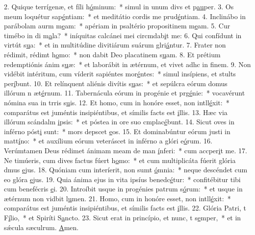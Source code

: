 2. Quique terrígenæ, et fíli h\uline{ó}minum:~* simul in unum divs et p\uline{au}per.
3. Os meum loquétur sap\uline{é}ntiam:~* et meditátio cordis me prud\uline{é}ntiam.
4. Inclinábo in parábolam aurm m\uline{e}am:~* apériam in psaltério propositinem m\uline{e}am.
5. Cur timébo in di m\uline{a}la?~* iníquitas calcánei mei circmdab\uline{i}t me:
6. Qui confídunt in virtút s\uline{u}a:~* et in multitúdine divitiárum suárum glri\uline{á}ntur.
7. Frater non rédimit, rédimt h\uline{o}mo:~* non dabit Deo placatinem s\uline{u}am.
8. Et prétium redemptiónis ánim s\uline{u}æ:~* et laborábit in ætérnum, et vivet adhc in f\uline{i}nem.
9. Non vidébit intéritum, cum víderit sapiéntes mor\uline{é}ntes:~* simul insípiens, et stults per\uline{í}bunt.
10. Et relínquent aliénis divítis s\uline{u}as:~* et sepúlcra eórum domus illórum n æt\uline{é}rnum.
11. Tabernácula eórum in progénie et prg\uline{é}nie:~* vocavérunt nómina sua in trris s\uline{u}is.
12. Et homo, cum in honóre esset, non intll\uline{é}xit:~* comparátus est juméntis insipiéntibus, et símilis facts est \uline{i}llis.
13. Hæc via illórum scándalm \uline{i}psis:~* et póstea in ore suo cmplac\uline{é}bunt.
14. Sicut oves in inférno póst\uline{i} sunt:~* mors depscet \uline{e}os.
15. Et dominabúntur eórum justi in matt\uline{í}no:~* et auxílium eórum veteráscet in inférno a glóri e\uline{ó}rum.
16. Verúmtamen Deus rédimet ánimam meam de man \uline{í}nferi:~* cum accper\uline{i}t me.
17. Ne timúeris, cum dives factus fúert h\uline{o}mo:~* et cum multiplicáta fúerit glória dmus \uline{e}jus.
18. Quóniam cum interíerit, non sumt \uline{ó}mnia:~* neque descéndet cum eo glóra \uline{e}jus.
19. Quia ánima ejus in vita ipsíus benedc\uline{é}tur:~* confitébitur tibi cum benefécris \uline{e}i.
20. Introíbit usque in progénies patrum s\uline{ó}rum:~* et usque in ætérnum non vidbit l\uline{u}men.
21. Homo, cum in honóre esset, non intll\uline{é}xit:~* comparátus est juméntis insipiéntibus, et símilis facts est \uline{i}llis.
22. Glória Patri, t F\uline{í}lio,~* et Spiríti S\uline{a}ncto.
23. Sicut erat in princípio, et nunc, t s\uline{e}mper,~* et in sǽcula sæculrum. \uline{A}men.

